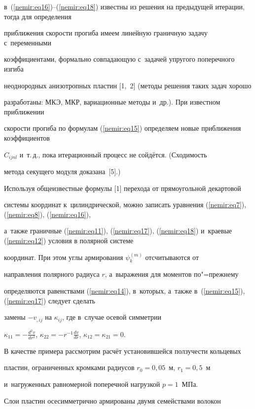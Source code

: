 в~(\ref{nemir:eq16})--(\ref{nemir:eq18}) известны из решения на предыдущей итерации, тогда для определения 

приближения скорости прогиба имеем линейную граничную задачу с~переменными 

коэффициентами, формально совпадающую с~задачей упругого поперечного изгиба 

неоднородных анизотропных пластин [1,~2] (методы решения таких задач хорошо 

разработаны: МКЭ, МКР, вариационные методы и~др.). При известном приближении 

скорости прогиба по формулам (\ref{nemir:eq15}) определяем новые приближения коэффициентов 

$C_{ijnl} $ и~т.\,д., пока итерационный процесс не сойдётся. (Сходимость 

метода секущего модуля доказана~[5].)





Используя общеизвестные формулы [1] перехода от прямоугольной декартовой 

системы координат к~цилиндрической, можно записать уравнения (\ref{nemir:eq7}), (\ref{nemir:eq8}), (\ref{nemir:eq16}), 

а~также граничные (\ref{nemir:eq11}), (\ref{nemir:eq17}), (\ref{nemir:eq18}) и~краевые (\ref{nemir:eq12}) условия в полярной системе 

координат. При этом углы армирования $\psi _k^{(m)}$ отсчитываются от 

направления полярного радиуса $r$, а~выражения для моментов по"=прежнему 

определяются равенствами (\ref{nemir:eq14}), в~которых, а~также в~(\ref{nemir:eq15}), (\ref{nemir:eq17}) следует сделать 

замены $ - v_{,ij} $ на $\kappa _{ij} $, где в~случае осевой симметрии 

$\kappa _{11} = - \frac{d^2v}{dr^2}$, $\kappa _{22} = - r^{ - 1} \frac{dv}{dr}$, $\kappa _{12} = \kappa _{21} = 0$.





В качестве примера рассмотрим расчёт установившейся ползучести кольцевых 

пластин, ограниченных кромками радиусов $r_0 = 0,05$~м, $r_1 = 0,5$~м 

и~нагруженных равномерной поперечной нагрузкой $p = 1$~МПа. 

Слои пластин осесимметрично армированы двумя семействами волокон 

